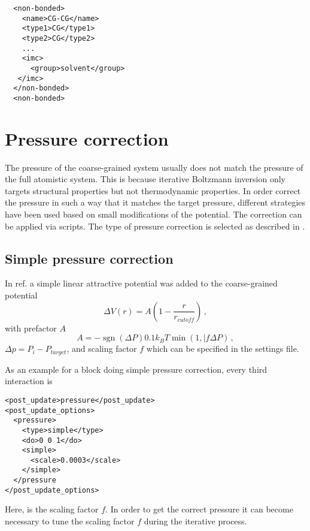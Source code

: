 \begin{lstlisting}
  <non-bonded>
    <name>CG-CG</name>
    <type1>CG</type1>
    <type2>CG</type2>
    ...
    <imc>
      <group>solvent</group>
   </imc>
  </non-bonded>
  <non-bonded>
\end{lstlisting}



\section{Pressure correction}

The pressure of the coarse-grained system usually does not match the pressure of the full atomistic system. This is because iterative Boltzmann inversion only targets structural properties but not thermodynamic properties. In order correct the pressure in such a way that it matches the target pressure, different strategies have been used based on small modifications of the potential. The correction can be applied via  scripts. The type of pressure correction is selected as described in .

\subsection{Simple pressure correction}
In ref.\cite{Reith:2003} a simple linear attractive potential was added to the coarse-grained potential
\begin{equation}
  \Delta V(r)=A(1-\frac{r}{r_{cutoff}}) \,,
\end{equation}
with prefactor $A$
\begin{equation}
  A = -\operatorname{sgn}(\Delta P)0.1k_{B}T\min(1,|f\Delta P) \,,
\end{equation}
$\Delta p=P_i-P_{target}$, and scaling factor $f$ which can be specified in the settings file.

As an example for a block doing simple pressure correction, every third interaction is
\begin{lstlisting}
<post_update>pressure</post_update>
<post_update_options>
  <pressure>
    <type>simple</type>
    <do>0 0 1</do>
    <simple>
      <scale>0.0003</scale>
    </simple>
  </pressure
</post_update_options>
\end{lstlisting}
Here,  is the scaling factor $f$. In order to get the correct pressure it can become necessary to tune the scaling factor $f$ during the iterative process.

